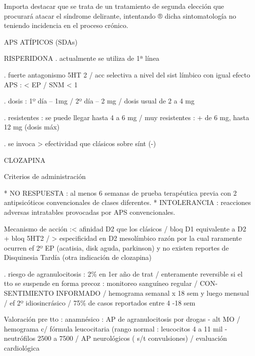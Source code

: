 Importa destacar que se trata de un tratamiento de segunda elección que procurará atacar el síndrome delirante, intentando ® dicha sintomatología no teniendo incidencia en el proceso crónico.

APS ATÍPICOS (SDAs)

RISPERIDONA . actualmente se utiliza de 1ª línea

. fuerte antagonismo 5HT 2 / acc selectiva a nivel del sist límbico con igual efecto APS : < EP / SNM < 1%

. dosis : 1º día – 1mg / 2º día – 2 mg / dosis usual de 2 a 4 mg

. resistentes : se puede llegar hasta 4 a 6 mg / muy resistentes : + de 6 mg, hasta 12 mg (dosis máx)

. se invoca > efectividad que clásicos sobre sínt (-)

CLOZAPINA

Criterios de administración

* NO RESPUESTA : al menos 6 semanas de prueba terapéutica previa con 2 antipsicóticos convencionales de clases diferentes.
* INTOLERANCIA : reacciones adversas intratables provocadas por APS convencionales.

Mecanismo de acción :< afinidad D2 que los clásicos / bloq D1 equivalente a D2 + bloq 5HT2 / > especificidad en D2 mesolímbico razón por la cual raramente ocurren ef 2º EP (acatisia, disk aguda, parkinson) y no existen reportes de Disquinesia Tardía (otra indicación de clozapina)

. riesgo de agranulocitosis : 2\% en 1er año de trat / enteramente reversible si el tto se suspende en forma precoz : monitoreo sanguíneo regular / CON-SENTIMIENTO INFORMADO / hemograma semanal x 18 sem y luego mensual / ef 2º idiosincrásico / 75\% de casos reportados entre 4 -18 sem

Valoración pre tto : anamnésico : AP de agranulocitosis por drogas - alt MO / hemograma c/ fórmula leucocitaria (rango normal : leucocitos 4 a 11 mil - neutrófilos 2500 a 7500 / AP neurológicos ( s/t convulsiones) / evaluación cardiológica

